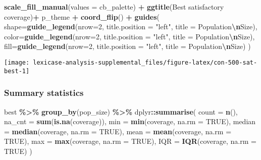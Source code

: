 \documentclass[
]{book}
\newenvironment{Shaded}{\begin{snugshade}}{\end{snugshade}}
\newcommand{\AttributeTok}[1]{\textcolor[rgb]{0.13,0.29,0.53}{#1}}
\newcommand{\ConstantTok}[1]{\textcolor[rgb]{0.56,0.35,0.01}{#1}}
\newcommand{\DecValTok}[1]{\textcolor[rgb]{0.00,0.00,0.81}{#1}}
\newcommand{\FunctionTok}[1]{\textcolor[rgb]{0.13,0.29,0.53}{\textbf{#1}}}
\newcommand{\NormalTok}[1]{#1}
\newcommand{\SpecialCharTok}[1]{\textcolor[rgb]{0.81,0.36,0.00}{\textbf{#1}}}
\newcommand{\StringTok}[1]{\textcolor[rgb]{0.31,0.60,0.02}{#1}}
\begin{document}
\begin{Shaded}
\begin{Highlighting}[]
  \FunctionTok{scale\_fill\_manual}\NormalTok{(}\AttributeTok{values =}\NormalTok{ cb\_palette) }\SpecialCharTok{+}
  \FunctionTok{ggtitle}\NormalTok{(}\StringTok{\textquotesingle{}Best satisfactory coverage\textquotesingle{}}\NormalTok{)}\SpecialCharTok{+}
\NormalTok{  p\_theme }\SpecialCharTok{+} \FunctionTok{coord\_flip}\NormalTok{() }\SpecialCharTok{+}
  \FunctionTok{guides}\NormalTok{(}
    \AttributeTok{shape=}\FunctionTok{guide\_legend}\NormalTok{(}\AttributeTok{nrow=}\DecValTok{2}\NormalTok{, }\AttributeTok{title.position =} \StringTok{"left"}\NormalTok{, }\AttributeTok{title =} \StringTok{\textquotesingle{}Population}\SpecialCharTok{\textbackslash{}n}\StringTok{Size\textquotesingle{}}\NormalTok{),}
    \AttributeTok{color=}\FunctionTok{guide\_legend}\NormalTok{(}\AttributeTok{nrow=}\DecValTok{2}\NormalTok{, }\AttributeTok{title.position =} \StringTok{"left"}\NormalTok{, }\AttributeTok{title =} \StringTok{\textquotesingle{}Population}\SpecialCharTok{\textbackslash{}n}\StringTok{Size\textquotesingle{}}\NormalTok{),}
    \AttributeTok{fill=}\FunctionTok{guide\_legend}\NormalTok{(}\AttributeTok{nrow=}\DecValTok{2}\NormalTok{, }\AttributeTok{title.position =} \StringTok{"left"}\NormalTok{, }\AttributeTok{title =} \StringTok{\textquotesingle{}Population}\SpecialCharTok{\textbackslash{}n}\StringTok{Size\textquotesingle{}}\NormalTok{)}
\NormalTok{  )}
\end{Highlighting}
\end{Shaded}

\texttt{[image: lexicase-analysis-supplemental\_files/figure-latex/con-500-sat-best-1]}

\hypertarget{summary-statistics-8}{%
\subsubsection{Summary statistics}\label{summary-statistics-8}}

\begin{Shaded}
\begin{Highlighting}[]
\NormalTok{best }\SpecialCharTok{\%\textgreater{}\%}
  \FunctionTok{group\_by}\NormalTok{(pop\_size) }\SpecialCharTok{\%\textgreater{}\%}
\NormalTok{  dplyr}\SpecialCharTok{::}\FunctionTok{summarise}\NormalTok{(}
    \AttributeTok{count =} \FunctionTok{n}\NormalTok{(),}
    \AttributeTok{na\_cnt =} \FunctionTok{sum}\NormalTok{(}\FunctionTok{is.na}\NormalTok{(coverage)),}
    \AttributeTok{min =} \FunctionTok{min}\NormalTok{(coverage, }\AttributeTok{na.rm =} \ConstantTok{TRUE}\NormalTok{),}
    \AttributeTok{median =} \FunctionTok{median}\NormalTok{(coverage, }\AttributeTok{na.rm =} \ConstantTok{TRUE}\NormalTok{),}
    \AttributeTok{mean =} \FunctionTok{mean}\NormalTok{(coverage, }\AttributeTok{na.rm =} \ConstantTok{TRUE}\NormalTok{),}
    \AttributeTok{max =} \FunctionTok{max}\NormalTok{(coverage, }\AttributeTok{na.rm =} \ConstantTok{TRUE}\NormalTok{),}
    \AttributeTok{IQR =} \FunctionTok{IQR}\NormalTok{(coverage, }\AttributeTok{na.rm =} \ConstantTok{TRUE}\NormalTok{)}
\NormalTok{  )}
\end{Highlighting}
\end{Shaded}
\end{document}
